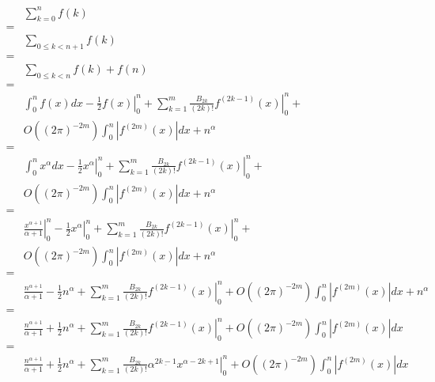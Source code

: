 \documentclass{article}
\begin{document}
\begin{align*}
& \sum_{k=0}^n f(k) \\
= & \\
& \sum_{0 \leq k < n+1} f(k) \\
= & \\
& \sum_{0 \leq k < n} f(k) + f(n) \\
= & \\
& \int_0^n f(x)dx - \left. \frac{1}{2} f(x) \right|_0^n + \sum_{k=1}^m \frac{B_{2k}}{(2k)!} \left. f^{(2k-1)}(x) \right|_0^n + \\
& O((2\pi)^{-2m}) \int_0^n | f^{(2m)}(x) | dx + n^\alpha \\
= & \\
& \int_0^n x^\alpha dx - \left. \frac{1}{2} x^\alpha \right|_0^n + \sum_{k=1}^m \frac{B_{2k}}{(2k)!} \left. f^{(2k-1)}(x) \right|_0^n + \\
& O((2\pi)^{-2m}) \int_0^n | f^{(2m)}(x) | dx + n^\alpha \\
= & \\
& \left. \frac{x^{\alpha+1}}{\alpha+1} \right|_0^n
  - \left. \frac{1}{2} x^\alpha \right|_0^n + \sum_{k=1}^m \frac{B_{2k}}{(2k)!} \left. f^{(2k-1)}(x) \right|_0^n + \\
& O((2\pi)^{-2m}) \int_0^n | f^{(2m)}(x) | dx + n^\alpha \\
= & \\
& \frac{n^{\alpha+1}}{\alpha+1}
  - \frac{1}{2} n^\alpha + \sum_{k=1}^m \frac{B_{2k}}{(2k)!} \left. f^{(2k-1)}(x) \right|_0^n 
  + O((2\pi)^{-2m}) \int_0^n | f^{(2m)}(x) | dx + n^\alpha \\
= & \\
& \frac{n^{\alpha+1}}{\alpha+1}
  + \frac{1}{2} n^\alpha + \sum_{k=1}^m \frac{B_{2k}}{(2k)!} \left. f^{(2k-1)}(x) \right|_0^n 
  + O((2\pi)^{-2m}) \int_0^n | f^{(2m)}(x) | dx \\
= & \\
& \frac{n^{\alpha+1}}{\alpha+1}
  + \frac{1}{2} n^\alpha + \sum_{k=1}^m \frac{B_{2k}}{(2k)!} \left. \alpha^{\underline{2k-1}} x^{\alpha-2k+1} \right|_0^n +
  O((2\pi)^{-2m}) \int_0^n | f^{(2m)}(x) | dx \\
\end{align*}
\end{document}
